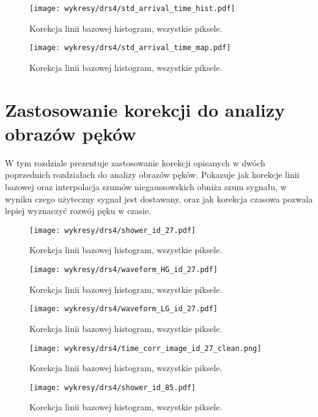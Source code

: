 \documentclass[a4paper,11pt,twoside]{article}
\begin{document}
\begin{figure}[H] 
\centering
\texttt{[image: wykresy/drs4/std\_arrival\_time\_hist.pdf]}
\caption{Korekcja linii bazowej histogram, wszystkie piksele.}
\label{fig:muon_image}
\end{figure}

\begin{figure}[H] 
\centering
\texttt{[image: wykresy/drs4/std\_arrival\_time\_map.pdf]}
\caption{Korekcja linii bazowej histogram, wszystkie piksele.}
\label{fig:muon_image}
\end{figure}
\newpage
\section{Zastosowanie korekcji do analizy obrazów pęków}
W tym rozdziale prezentuje zastosowanie korekcji opisanych w dwóch poprzednich rozdziałach do analizy obrazów pęków. Pokazuje jak korekcje linii bazowej oraz interpolacja szumów niegaussowskich obniża szum sygnału, w wyniku czego użyteczny sygnał jest dostawany, oraz jak korekcja czasowa pozwala lepiej wyznaczyć rozwój pęku w czasie.
\begin{figure}[H] 
\centering
\texttt{[image: wykresy/drs4/shower\_id\_27.pdf]}
\caption{Korekcja linii bazowej histogram, wszystkie piksele.}
\label{fig:muon_image}
\end{figure}

\begin{figure}[H] 
\centering
\texttt{[image: wykresy/drs4/waveform\_HG\_id\_27.pdf]}
\caption{Korekcja linii bazowej histogram, wszystkie piksele.}
\label{fig:muon_image}
\end{figure}

\begin{figure}[H] 
\centering
\texttt{[image: wykresy/drs4/waveform\_LG\_id\_27.pdf]}
\caption{Korekcja linii bazowej histogram, wszystkie piksele.}
\label{fig:muon_image}
\end{figure}

\begin{figure}[H] 
\centering
\texttt{[image: wykresy/drs4/time\_corr\_image\_id\_27\_clean.png]}
\caption{Korekcja linii bazowej histogram, wszystkie piksele.}
\label{fig:muon_image}
\end{figure}

\begin{figure}[H] 
\centering
\texttt{[image: wykresy/drs4/shower\_id\_85.pdf]}
\caption{Korekcja linii bazowej histogram, wszystkie piksele.}
\label{fig:muon_image}
\end{figure}
\end{document}
